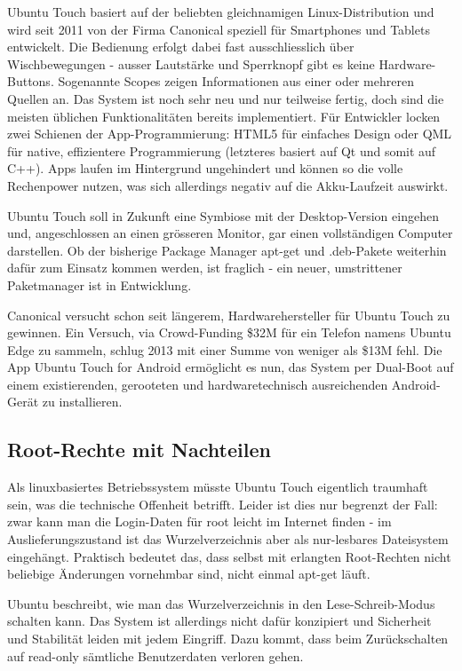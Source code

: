 Ubuntu Touch basiert auf der beliebten gleichnamigen Linux-Distribution und wird seit 2011 von der Firma Canonical speziell für Smartphones und Tablets entwickelt. Die Bedienung erfolgt dabei fast ausschliesslich über Wischbewegungen - ausser Lautstärke und Sperrknopf gibt es keine Hardware-Buttons. Sogenannte Scopes zeigen Informationen aus einer oder mehreren Quellen an. Das System ist noch sehr neu und nur teilweise fertig, doch sind die meisten üblichen Funktionalitäten bereits implementiert. Für Entwickler locken zwei Schienen der App-Programmierung: HTML5 für einfaches Design oder QML für native, effizientere Programmierung (letzteres basiert auf Qt und somit auf C++). Apps laufen im Hintergrund ungehindert und können so die volle Rechenpower nutzen, was sich allerdings negativ auf die Akku-Laufzeit auswirkt.

Ubuntu Touch soll in Zukunft eine Symbiose mit der Desktop-Version eingehen und, angeschlossen an einen grösseren Monitor, gar einen vollständigen Computer darstellen. Ob der bisherige Package Manager apt-get und .deb-Pakete weiterhin dafür zum Einsatz kommen werden, ist fraglich - ein neuer, umstrittener Paketmanager ist in Entwicklung.

Canonical versucht schon seit längerem, Hardwarehersteller für Ubuntu Touch zu gewinnen. Ein Versuch, via Crowd-Funding \$32M für ein Telefon namens Ubuntu Edge zu sammeln, schlug 2013 mit einer Summe von weniger als \$13M fehl. Die App Ubuntu Touch for Android ermöglicht es nun, das System per Dual-Boot auf einem existierenden, gerooteten und hardwaretechnisch ausreichenden Android-Gerät zu installieren.

\subsection{Root-Rechte mit Nachteilen}
Als linuxbasiertes Betriebssystem müsste Ubuntu Touch eigentlich traumhaft sein, was die technische Offenheit betrifft. Leider ist dies nur begrenzt der Fall: zwar kann man die Login-Daten für root leicht im Internet finden - im Auslieferungszustand ist das Wurzelverzeichnis aber als nur-lesbares Dateisystem eingehängt. Praktisch bedeutet das, dass selbst mit erlangten Root-Rechten nicht beliebige Änderungen vornehmbar sind, nicht einmal apt-get läuft.

Ubuntu beschreibt, wie man das Wurzelverzeichnis in den Lese-Schreib-Modus schalten kann. Das System ist allerdings nicht dafür konzipiert und Sicherheit und Stabilität leiden mit jedem Eingriff. Dazu kommt, dass beim Zurückschalten auf read-only sämtliche Benutzerdaten verloren gehen.

